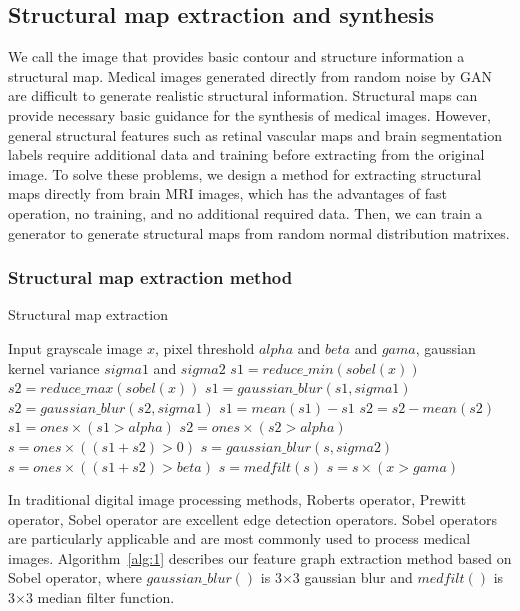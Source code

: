 \documentclass[runningheads]{llncs}
\begin{document}
\subsection{Structural map extraction and synthesis}
We call the image that provides basic contour and structure information a structural map.  Medical images generated directly from random noise by GAN are difficult to generate realistic structural information. Structural maps can provide necessary basic guidance for the synthesis of medical images. However, general structural features such as retinal vascular maps\cite{41costa2017towards} and brain segmentation labels \cite{4shin2018medical}require additional data and training before extracting from the original image. To solve these problems, we design a method for extracting structural maps directly from brain MRI images, which has the advantages of fast operation, no training, and no additional required data. Then, we can train a generator to generate structural maps from random normal distribution matrixes.

\subsubsection{Structural map extraction method}
\begin{algorithm}
	\caption{Structural map extraction}
	\label{alg:1}
	\begin{multicols}{2}
		\begin{algorithmic}[1]
			\State Input grayscale image $x$,
			pixel threshold $alpha$ and $beta$ and $gama$,
			gaussian kernel variance $sigma1$ and $sigma2$
			\State $s1 = reduce\_min(sobel(x))$
			\State $s2 = reduce\_max(sobel(x))$
			\State $s1 = gaussian\_blur(s1,sigma1)$
			\State $s2 = gaussian\_blur(s2,sigma1)$
			\State $s1 = mean(s1) - s1$
			\State $s2 = s2 - mean(s2)$
			\State $s1 = ones \times (s1 > alpha)$
			\State $s2 = ones \times (s2 > alpha)$
			\State $s = ones \times ((s1 + s2)> 0)$
			\State $s = gaussian\_blur(s,sigma2)$
			\State $s = ones \times ((s1 + s2)> beta)$
			\State $s = medfilt(s)$
			\State $s = s \times (x > gama)$
		\end{algorithmic}  
	\end{multicols}
\end{algorithm}
In traditional digital image processing methods, Roberts operator\cite{145Roberts}, Prewitt operator\cite{146prewitt}, Sobel operator\cite{147Sobel} are excellent edge detection operators. Sobel operators are particularly applicable and are most commonly used to process medical images. Algorithm~\ref{alg:1} describes our feature graph extraction method based on Sobel operator, where  $gaussian\_blur()$ is 3$\times$3 gaussian blur and  $medfilt()$ is 3$\times$3 median filter function.
\end{document}
